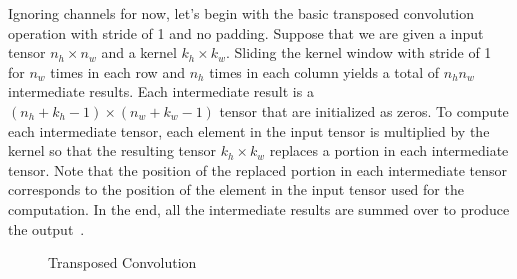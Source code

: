 Ignoring channels for now, let’s begin with the basic transposed convolution operation with stride of 1 and no padding.
Suppose that we are given a input tensor \( n_{h} \times n_{w} \) and a  kernel \( k_{h} \times  k_{w} \).
Sliding the kernel window with stride of 1 for \( n_{w} \) times in each row and \( n_{h} \) times in each column yields a total of \( n_{h}n_{w} \) intermediate results.
Each intermediate result is a \( \left(n_{h} + k_{h} -1\right) \times  \left(n_{w} + k_{w} - 1\right) \) tensor that are initialized as zeros.
To compute each intermediate tensor, each element in the input tensor is multiplied by the kernel so that the resulting tensor \( k_{h} \times k_{w} \) replaces a portion in each intermediate tensor.
Note that the position of the replaced portion in each intermediate tensor corresponds to the position of the element in the input tensor used for the computation.
In the end, all the intermediate results are summed over to produce the output~\cite[Chapter~14.10]{zhang2023dive}.


\begin{figure}

	\begin{center}
		
	\end{center}
	\caption{Transposed Convolution~\cite[Chapter~14.10]{zhang2023dive}}\label{fig:trans_conv}
\end{figure}




